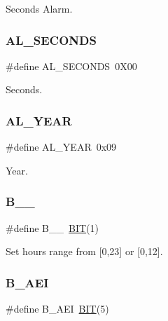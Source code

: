 Seconds Alarm. 

\hypertarget{group___serial_gaff232d9a767044ad7e38751aa010880c}{}\label{group___serial_gaff232d9a767044ad7e38751aa010880c} 
\subsubsection{\texorpdfstring{A\+L\+\_\+\+S\+E\+C\+O\+N\+DS}{AL\_SECONDS}}
{\footnotesize\ttfamily \#define A\+L\+\_\+\+S\+E\+C\+O\+N\+DS~0\+X00}



Seconds. 

\hypertarget{group___serial_ga05557977458cf6879226d194bb46538f}{}\label{group___serial_ga05557977458cf6879226d194bb46538f} 
\subsubsection{\texorpdfstring{A\+L\+\_\+\+Y\+E\+AR}{AL\_YEAR}}
{\footnotesize\ttfamily \#define A\+L\+\_\+\+Y\+E\+AR~0x09}



Year. 

\hypertarget{group___serial_ga36493e94586e07546a955df01037e645}{}\label{group___serial_ga36493e94586e07546a955df01037e645} 
\subsubsection{\texorpdfstring{B\+\_\+\_}{B\_24\_12}}
{\footnotesize\ttfamily \#define B\+\_\+\_~\hyperlink{group___serial_ga3a8ea58898cb58fc96013383d39f482c}{B\+IT}(1)}



Set hours range from \mbox{[}0,23\mbox{]} or \mbox{[}0,12\mbox{]}. 

\hypertarget{group___serial_gaa142656507b3d006de794d8014fe4a58}{}\label{group___serial_gaa142656507b3d006de794d8014fe4a58} 
\subsubsection{\texorpdfstring{B\+\_\+\+A\+EI}{B\_AEI}}
{\footnotesize\ttfamily \#define B\+\_\+\+A\+EI~\hyperlink{group___serial_ga3a8ea58898cb58fc96013383d39f482c}{B\+IT}(5)}



